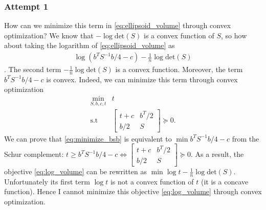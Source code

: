 \documentclass{article}
\begin{document}
\subsubsection{Attempt 1}
How can we minimize this term in \eqref{eq:ellipsoid_volume} through convex optimization? We know that $-\log\text{det}(S)$ is a convex function of $S$, so how about taking the logarithm of \eqref{eq:ellipsoid_volume} as
\begin{align}
	\log(b^TS^{-1}b/4-c) - \frac{1}{n}\log\text{det}(S) \label{eq:log_volume}
\end{align}
. The second term $-\frac{1}{n}\log\text{det}(S)$ is a convex function. Moreover, the term $b^TS^{-1}b/4-c$ is convex. Indeed, we can minimize this term through convex optimization
\begin{subequations}
\begin{align}
	\min_{S, b, c, t}& t\\
	\text{s.t }& \begin{bmatrix} t + c & b^T/2\\ b/2 & S \end{bmatrix} \succeq 0.
\end{align}
\label{eq:minimize_bsb}
\end{subequations}
We can prove that \eqref{eq:minimize_bsb} is equivalent to $\min b^TS^{-1}b/4-c$ from the Schur complement: $t \ge b^TS^{-1}b/4-c \Leftrightarrow \begin{bmatrix} t+c & b^T/2 \\b/2 & S \end{bmatrix} \succeq 0$. As a result, the objective \eqref{eq:log_volume} can be rewritten as $\min \log t - \frac{1}{n}\log\text{det}(S)$. Unfortunately its first term $\log t$ is not a convex function of $t$ (it is a concave function). Hence I cannot minimize this objective \eqref{eq:log_volume} through convex optimization.
\end{document}
